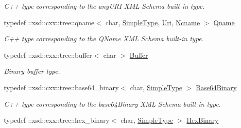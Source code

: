 \begin{DoxyCompactItemize}
\begin{DoxyCompactList}\small\item\em C++ type corresponding to the anyURI XML Schema built-\/in type. \item\end{DoxyCompactList}\item 
\hypertarget{namespacexml__schema_a2d07f8e92d03ad192adbbc7498a72b72}{
typedef ::xsd::cxx::tree::qname$<$ char, \hyperlink{namespacexml__schema_a1171be9b6e593e49b895a46671f5dc5f}{SimpleType}, \hyperlink{namespacexml__schema_ae14d61a2e71e44fa4b46c9492c59b44d}{Uri}, \hyperlink{namespacexml__schema_aceb9a08fa292b3b3af49f5aa42d06fa9}{Ncname} $>$ \hyperlink{namespacexml__schema_a2d07f8e92d03ad192adbbc7498a72b72}{Qname}}
\label{namespacexml__schema_a2d07f8e92d03ad192adbbc7498a72b72}

\begin{DoxyCompactList}\small\item\em C++ type corresponding to the QName XML Schema built-\/in type. \item\end{DoxyCompactList}\item 
\hypertarget{namespacexml__schema_af8732a0949261972e4b167f50a23275d}{
typedef ::xsd::cxx::tree::buffer$<$ char $>$ \hyperlink{namespacexml__schema_af8732a0949261972e4b167f50a23275d}{Buffer}}
\label{namespacexml__schema_af8732a0949261972e4b167f50a23275d}

\begin{DoxyCompactList}\small\item\em Binary buffer type. \item\end{DoxyCompactList}\item 
\hypertarget{namespacexml__schema_a439c138de03306df7e07a447abfe54ed}{
typedef ::xsd::cxx::tree::base64\_\-binary$<$ char, \hyperlink{namespacexml__schema_a1171be9b6e593e49b895a46671f5dc5f}{SimpleType} $>$ \hyperlink{namespacexml__schema_a439c138de03306df7e07a447abfe54ed}{Base64Binary}}
\label{namespacexml__schema_a439c138de03306df7e07a447abfe54ed}

\begin{DoxyCompactList}\small\item\em C++ type corresponding to the base64Binary XML Schema built-\/in type. \item\end{DoxyCompactList}\item 
\hypertarget{namespacexml__schema_ac344f65d115a7291df483b253bc995cb}{
typedef ::xsd::cxx::tree::hex\_\-binary$<$ char, \hyperlink{namespacexml__schema_a1171be9b6e593e49b895a46671f5dc5f}{SimpleType} $>$ \hyperlink{namespacexml__schema_ac344f65d115a7291df483b253bc995cb}{HexBinary}}
\label{namespacexml__schema_ac344f65d115a7291df483b253bc995cb}


\end{DoxyCompactItemize}
